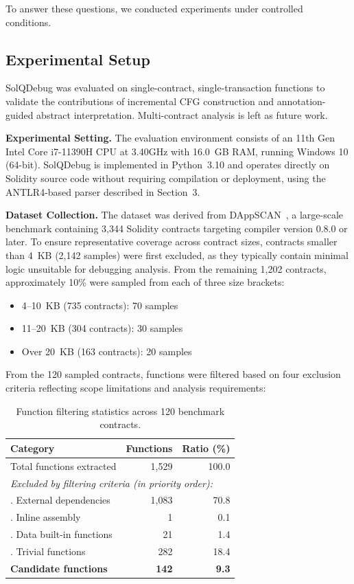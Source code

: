 \documentclass[pdflatex,sn-basic]{sn-jnl}%
\theoremstyle{thmstyleone}%
\theoremstyle{thmstyletwo}%
\theoremstyle{thmstylethree}%
\begin{document}
To answer these questions, we conducted experiments under controlled conditions.

\subsection{Experimental Setup}
SolQDebug was evaluated on single-contract, single-transaction functions
to validate the contributions of incremental CFG construction and
annotation-guided abstract interpretation. Multi-contract analysis is left
as future work.

\smallskip
\noindent\textbf{Experimental Setting.}
The evaluation environment consists of an 11th Gen Intel\textregistered{} Core\texttrademark{}
i7-11390H CPU at 3.40GHz with 16.0~GB RAM, running Windows 10 (64-bit).
SolQDebug is implemented in Python~3.10 and operates directly on Solidity
source code without requiring compilation or deployment, using the ANTLR4-based
parser described in Section~3.

\smallskip
\noindent\textbf{Dataset Collection.}
The dataset was derived from DAppSCAN~\citep{dappscan}, a large-scale benchmark containing
3,344 Solidity contracts targeting compiler version 0.8.0 or later. To ensure representative
coverage across contract sizes, contracts smaller than 4~KB (2,142 samples) were first excluded,
as they typically contain minimal logic unsuitable for debugging analysis. From the remaining
1,202 contracts, approximately 10\% were sampled from each of three size brackets:
\begin{itemize}
  \item 4--10~KB (735 contracts): 70 samples
  \item 11--20~KB (304 contracts): 30 samples
  \item Over 20~KB (163 contracts): 20 samples
\end{itemize}
\noindent From the 120 sampled contracts, functions were filtered based on four exclusion criteria reflecting scope limitations and analysis requirements:

\begin{table}[t]
\centering
\caption{Function filtering statistics across 120 benchmark contracts.}
\label{tab:filtering-stats}
\begin{tabular*}{\columnwidth}{@{\extracolsep{\fill}}lrr@{}}
\toprule
\textbf{Category} & \textbf{Functions} & \textbf{Ratio (\%)} \\
\midrule
Total functions extracted & 1,529 & 100.0 \\
\midrule
\multicolumn{3}{l}{\textit{Excluded by filtering criteria (in priority order):}} \\
\quad 1. External dependencies & 1,083 & 70.8 \\
\quad 2. Inline assembly & 1 & 0.1 \\
\quad 3. Data built-in functions & 21 & 1.4 \\
\quad 4. Trivial functions & 282 & 18.4 \\
\midrule
\textbf{Candidate functions} & \textbf{142} & \textbf{9.3} \\
\bottomrule
\end{tabular*}
\end{table}
\end{document}
